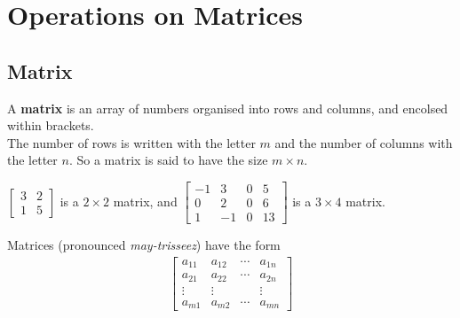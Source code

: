 \documentclass[../notes.tex]{subfiles}
\begin{document}
		\section{Operations on Matrices}
			\subsection{Matrix}
				A \textbf{matrix} is an array of numbers organised into rows and columns, and encolsed within brackets.\\
				The number of rows is written with the letter $m$ and the number of columns with the letter $n$. So a matrix is said to have the size $m \times n$.
				\begin{examplebox}
					$\begin{bmatrix}
						3 & 2\\
						1 & 5
					\end{bmatrix}$ is a $2 \times 2$ matrix, and
					$\begin{bmatrix}
						-1 & 3 & 0 & 5\\
						0 & 2 & 0 & 6\\
						1 & - 1& 0 & 13
					\end{bmatrix}$ is a $3 \times 4$ matrix.
				\end{examplebox}
				Matrices (pronounced \textit{may-trisseez}) have the form 
				\begin{align*}
					\begin{bmatrix}
						a_{11} & a_{12} & \cdots & a_{1n}\\
						a_{21} & a_{22} & \cdots & a_{2n}\\
						\vdots & \vdots & & \vdots\\
						a_{m1} & a_{m2} & \cdots & a_{mn}
					\end{bmatrix}
				\end{align*}
\end{document}
